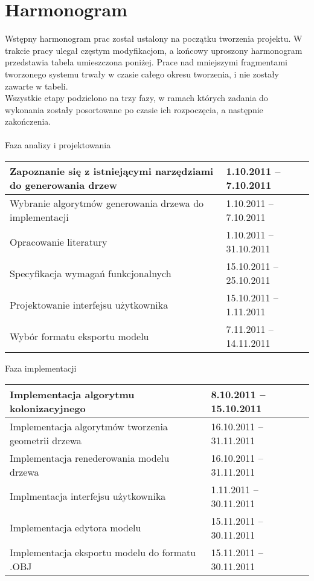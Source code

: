 \section{Harmonogram}
Wstępny harmonogram prac został ustalony na początku tworzenia projektu. W trakcie pracy ulegał częstym modyfikacjom, a końcowy uproszony harmonogram przedstawia tabela umieszczona poniżej. Prace nad mniejszymi fragmentami
tworzonego systemu trwały w czasie całego okresu tworzenia, i nie zostały zawarte w tabeli. 
\\\indent Wszystkie etapy podzielono na trzy fazy, w ramach których zadania do wykonania zostały posortowane
po czasie ich rozpoczęcia, a następnie zakończenia.\\ \\
    \indent Faza analizy i projektowania
	\begin{longtable}{|p{85mm}|p{42mm}|} \hline
	

    Zapoznanie się z istniejącymi narzędziami do generowania drzew &
    1.10.2011 -- 7.10.2011
    
    \\ \hline
    Wybranie algorytmów generowania drzewa do implementacji&
    1.10.2011 -- 7.10.2011
    \\ \hline

    Opracowanie literatury&
    1.10.2011 -- 31.10.2011
    \\ \hline

    Specyfikacja wymagań funkcjonalnych&
    15.10.2011 -- 25.10.2011
    \\ \hline
    
    Projektowanie interfejsu użytkownika &
    15.10.2011 -- 1.11.2011
    \\ \hline

    Wybór formatu eksportu modelu &
    7.11.2011 -- 14.11.2011
        \\ \hline

    
    \end{longtable}
	
     Faza implementacji
    \begin{longtable}{|p{85mm}|p{42mm}|} \hline
    Implementacja algorytmu kolonizacyjnego &
    8.10.2011 -- 15.10.2011
    \\ \hline

    Implementacja algorytmów tworzenia geometrii drzewa &
    16.10.2011 -- 31.11.2011 
    \\ \hline

    Implementacja renederowania modelu drzewa &
    16.10.2011 -- 31.11.2011
    \\ \hline

    Implmentacja interfejsu użytkownika &
    1.11.2011 -- 30.11.2011
    \\ \hline

    Implementacja edytora modelu &
    15.11.2011 -- 30.11.2011
    \\ \hline

    Implementacja eksportu modelu do formatu .OBJ&
    15.11.2011 -- 30.11.2011
    \\ \hline
	
   
    
    \end{longtable}
	
